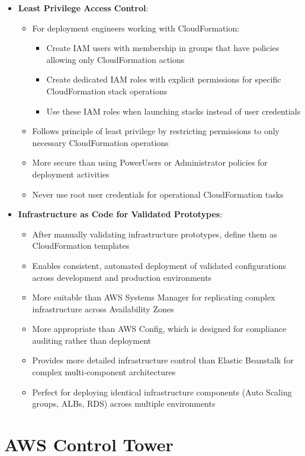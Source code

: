 \documentclass[11pt,a4paper]{report}
\begin{document}
\begin{itemize}
  \item \textbf{Least Privilege Access Control}:
\begin{itemize}
  \item For deployment engineers working with CloudFormation:
\begin{itemize}
  \item Create IAM users with membership in groups that have policies allowing only CloudFormation actions
  \item Create dedicated IAM roles with explicit permissions for specific CloudFormation stack operations
  \item Use these IAM roles when launching stacks instead of user credentials
\end{itemize}
  \item Follows principle of least privilege by restricting permissions to only necessary CloudFormation operations
  \item More secure than using PowerUsers or Administrator policies for deployment activities
  \item Never use root user credentials for operational CloudFormation tasks
\end{itemize}
  \item \textbf{Infrastructure as Code for Validated Prototypes}:
\begin{itemize}
  \item After manually validating infrastructure prototypes, define them as CloudFormation templates
  \item Enables consistent, automated deployment of validated configurations across development and production environments
  \item More suitable than AWS Systems Manager for replicating complex infrastructure across Availability Zones
  \item More appropriate than AWS Config, which is designed for compliance auditing rather than deployment
  \item Provides more detailed infrastructure control than Elastic Beanstalk for complex multi-component architectures
  \item Perfect for deploying identical infrastructure components (Auto Scaling groups, ALBs, RDS) across multiple environments
\end{itemize}
\end{itemize}


\section{AWS Control Tower}
\end{document}
